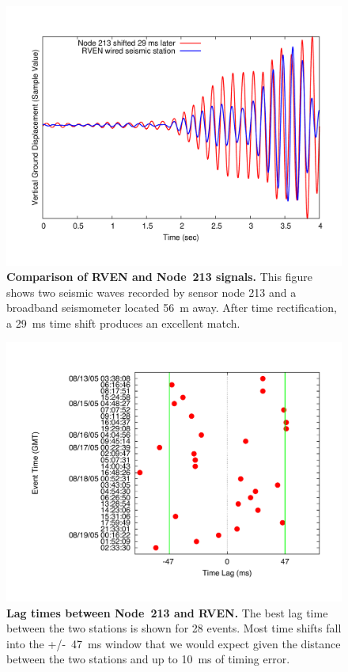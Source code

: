 \begin{figure}[t]
\begin{center}
\includegraphics[width=\hsize]{./3-evaluation/figs/broadbandmatch.pdf}
\end{center}

\caption{\textbf{Comparison of RVEN and Node~213 signals.} This figure shows
two seismic waves recorded by sensor node 213 and a broadband seismometer
located 56~m away. After time rectification, a 29~ms time shift produces an
excellent match.}

\label{evaluation-fig-broadbandmatch}
\end{figure}

\begin{figure}[t]
\begin{center}
\includegraphics[width=\hsize]{./3-evaluation/figs/timingscatterplot.pdf}
\end{center}

\caption{\textbf{Lag times between Node~213 and RVEN.} The best lag time
between the two stations is shown for 28 events. Most time shifts fall into
the +/-~47~ms window that we would expect given the distance between the two
stations and up to 10~ms of timing error.}

\label{evaluation-fig-timingscatterplot}
\end{figure}


